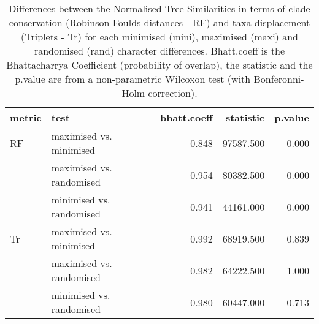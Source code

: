\begin{table}[ht]
\centering
\begin{tabular}{llr|rr}
  \hline
metric & test & bhatt.coeff & statistic & p.value \\ 
  \hline
RF & maximised vs. minimised & 0.848 & 97587.500 & 0.000 \\ 
   & maximised vs. randomised & 0.954 & 80382.500 & 0.000 \\ 
   & minimised vs. randomised & 0.941 & 44161.000 & 0.000 \\ 
  Tr & maximised vs. minimised & 0.992 & 68919.500 & 0.839 \\ 
   & maximised vs. randomised & 0.982 & 64222.500 & 1.000 \\ 
   & minimised vs. randomised & 0.980 & 60447.000 & 0.713 \\ 
   \hline
\end{tabular}
\caption{Differences between the Normalised Tree Similarities in terms of clade conservation (Robinson-Foulds distances - RF) and taxa displacement (Triplets - Tr) for each minimised (mini), maximised (maxi) and randomised (rand) character differences. Bhatt.coeff is the Bhattacharrya Coefficient (probability of overlap), the statistic and the p.value are from a non-parametric Wilcoxon test (with Bonferonni-Holm correction).} 
\label{Tab_pooledscenarios_test}
\end{table}
